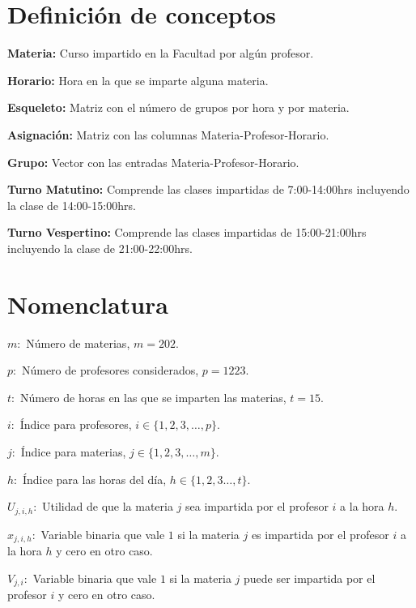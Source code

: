 \section{Definición de conceptos}

  
\textbf{Materia:} Curso impartido en la Facultad por algún profesor.

\textbf{Horario:} Hora en la que se imparte alguna materia.

\textbf{Esqueleto:} Matriz con el número de grupos por hora y por materia.

\textbf{Asignación:} Matriz con las columnas Materia-Profesor-Horario.

\textbf{Grupo:} Vector con las entradas Materia-Profesor-Horario.

\textbf{Turno Matutino:} Comprende las clases impartidas de 7:00-14:00hrs incluyendo la clase de 14:00-15:00hrs.

\textbf{Turno Vespertino:} Comprende las clases impartidas de 15:00-21:00hrs incluyendo la clase de 21:00-22:00hrs.


\section{Nomenclatura}

$m:$ Número de materias, $m = 202$.
  
  $p:$ Número de profesores considerados, $p = 1223$.
  
  $t:$ Número de horas en las que se imparten las materias, $t = 15$.
  
  $i:$ Índice para profesores, $i \in \{ 1, 2, 3, \ldots, p \}$.
  
  $j:$ Índice para materias, $j \in \{ 1, 2, 3, \ldots, m \}$.
  
  $h:$ Índice para las horas del día, $h \in \{ 1, 2, 3 \ldots, t\}$.
  
  $U_{j,i,h}:$ Utilidad de que la materia $j$ sea impartida por  el profesor $i$ a la hora $h$.
  
  $x_{j,i,h}:$ Variable binaria que vale $1$ si la materia $j$ es impartida por el profesor $i$ a la hora $h$ y cero en otro caso.

$V_{j,i}:$ Variable binaria que vale $1$ si la materia $j$ puede ser impartida por  el profesor $i$ y cero en otro caso.


%

